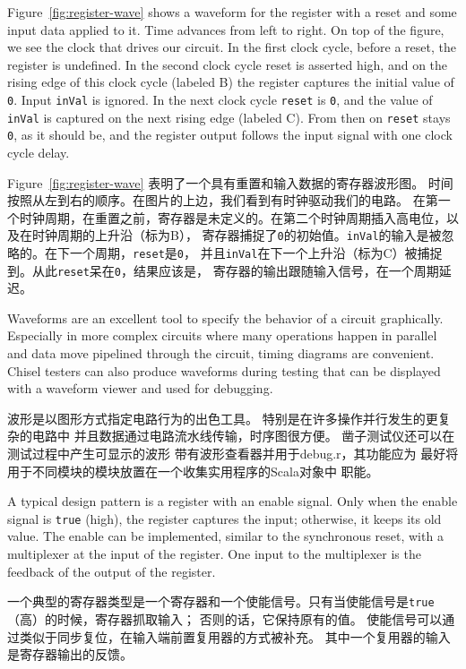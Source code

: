 \documentclass[%
    10pt,
    headinclude, footexclude,
    openright, %
    notitlepage,
    cleardoubleempty,
    headsepline,
    pointlessnumbers,
    bibtotoc, idxtotoc,
    ]{scrbook}
\newcommand{\code}[1]{{\small{\texttt{#1}}}}
\begin{document}
Figure~\ref{fig:register-wave} shows a waveform for the register with a reset
and some input data applied to it.
Time advances from left to right. On top of the figure, we see the clock that drives our circuit.
In the first clock cycle, before a reset, the register is undefined. In the second clock cycle reset
is asserted high, and on the rising edge of this clock cycle (labeled B) the register
captures the initial value of \code{0}. Input \code{inVal} is ignored. In the next clock cycle
\code{reset} is \code{0}, and the value of \code{inVal} is captured on the next rising
edge (labeled C). From then on \code{reset} stays \code{0}, as it should be, and the
register output follows the input signal with one clock cycle delay.

Figure~\ref{fig:register-wave} 表明了一个具有重置和输入数据的寄存器波形图。
时间按照从左到右的顺序。在图片的上边，我们看到有时钟驱动我们的电路。
在第一个时钟周期，在重置之前，寄存器是未定义的。在第二个时钟周期插入高电位，以及在时钟周期的上升沿（标为B），
寄存器捕捉了\code{0}的初始值。\code{inVal}的输入是被忽略的。在下一个周期，\code{reset}是\code{0}，
并且\code{inVal}在下一个上升沿（标为C）被捕捉到。从此\code{reset}呆在\code{0}，结果应该是，
寄存器的输出跟随输入信号，在一个周期延迟。

Waveforms are an excellent tool to specify the behavior of a circuit graphically.
Especially in more complex circuits where many operations happen in parallel
and data move pipelined through the circuit, timing diagrams are convenient.
Chisel testers can also produce waveforms during testing that can be displayed
with a waveform viewer and used for debugging.


波形是以图形方式指定电路行为的出色工具。
特别是在许多操作并行发生的更复杂的电路中
并且数据通过电路流水线传输，时序图很方便。
凿子测试仪还可以在测试过程中产生可显示的波形
带有波形查看器并用于debug.r，其功能应为
最好将用于不同模块的模块放置在一个收集实用程序的Scala对象中
职能。

A typical design pattern is a register with an enable signal. Only when the enable signal
is \code{true} (high), the register captures the input; otherwise, it keeps its old value.
The enable can be implemented, similar to the synchronous reset, with
a multiplexer at the input of the register. One input to the multiplexer is the feedback of the
output of the register.

一个典型的寄存器类型是一个寄存器和一个使能信号。只有当使能信号是\code{true}（高）的时候，寄存器抓取输入；
否则的话，它保持原有的值。
使能信号可以通过类似于同步复位，在输入端前置复用器的方式被补充。
其中一个复用器的输入是寄存器输出的反馈。
\end{document}
